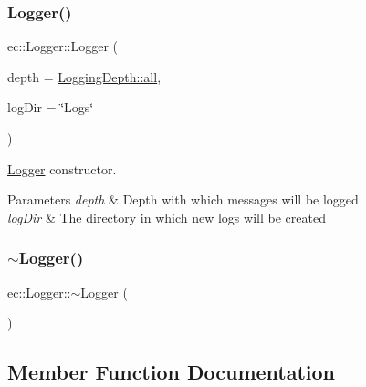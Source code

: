 \subsubsection{\texorpdfstring{Logger()}{Logger()}}
{\footnotesize\ttfamily ec\+::\+Logger\+::\+Logger (\begin{DoxyParamCaption}\item[{\mbox{\hyperlink{namespaceec_a4b0151aefd16631c24dd6464fd331e4b}{Logging\+Depth}}}]{depth = {\ttfamily \mbox{\hyperlink{namespaceec_a4b0151aefd16631c24dd6464fd331e4baa181a603769c1f98ad927e7367c7aa51}{Logging\+Depth\+::all}}},  }\item[{const std\+::string \&}]{log\+Dir = {\ttfamily \char`\"{}Logs\char`\"{}} }\end{DoxyParamCaption})\hspace{0.3cm}{\ttfamily [explicit]}}



\mbox{\hyperlink{classec_1_1_logger}{Logger}} constructor. 


\begin{DoxyParams}{Parameters}
{\em depth} & Depth with which messages will be logged \\
\hline
{\em log\+Dir} & The directory in which new logs will be created \\
\hline
\end{DoxyParams}
\mbox{\label{classec_1_1_logger_acc4668ba16f1368b352237df41af79d5}} 
\subsubsection{\texorpdfstring{$\sim$\+Logger()}{~Logger()}}
{\footnotesize\ttfamily ec\+::\+Logger\+::$\sim$\+Logger (\begin{DoxyParamCaption}{ }\end{DoxyParamCaption})\hspace{0.3cm}{\ttfamily [default]}}



\subsection{Member Function Documentation}
\mbox{\label{classec_1_1_logger_a9d90ffbfc32f3f6f56c9c3eaf50ee81d}} 
